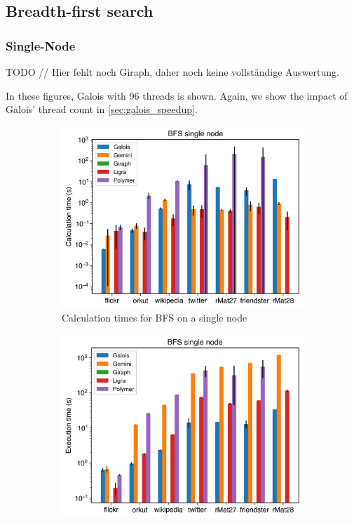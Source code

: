 
\subsection{Breadth-first search}
\subsubsection{Single-Node}
TODO // Hier fehlt noch Giraph, daher noch keine vollständige Auswertung.


In these figures, Galois with 96 threads is shown. Again, we show the impact of Galois' thread count in \autoref{sec:galois_speedup}.
\begin{figure}
	\begin{subfigure}{0.3\textwidth}
		\includegraphics[width=\linewidth]{../../plots/singleNodeBFS_calcTime.png}
		\caption{Calculation times for BFS on a single node}
		\label{fig:singleNodeBFS_calc}
	\end{subfigure}
	\hfil
	\begin{subfigure}{0.3\textwidth}
		\includegraphics[width=\linewidth]{../../plots/singleNodeBFS_execTime.png}

\end{subfigure}
\end{figure}
